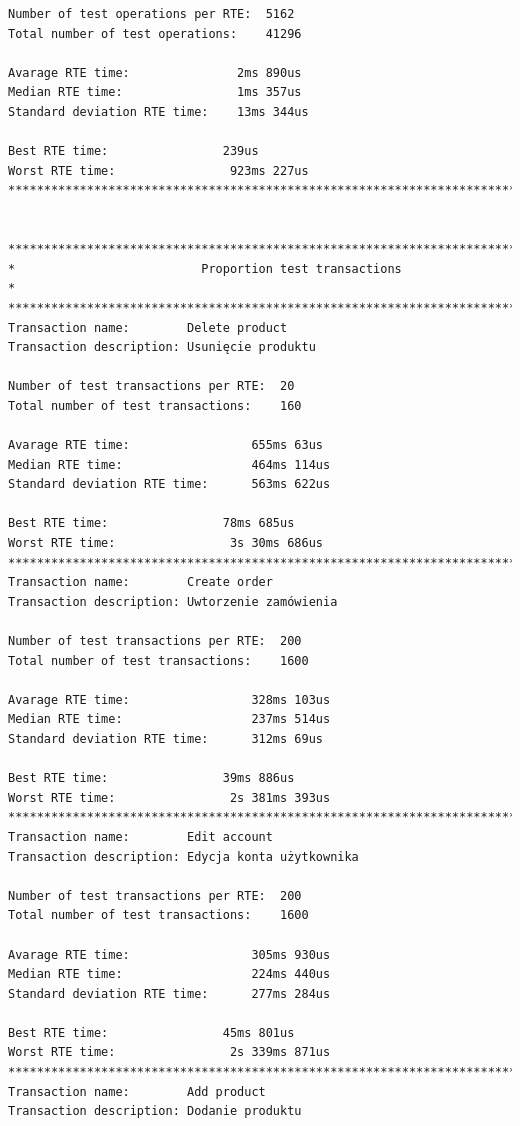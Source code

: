 \begin{Verbatim}
Number of test operations per RTE:  5162
Total number of test operations:    41296

Avarage RTE time:               2ms 890us
Median RTE time:                1ms 357us
Standard deviation RTE time:    13ms 344us

Best RTE time:                239us
Worst RTE time:                923ms 227us
*********************************************************************************


*********************************************************************************
*                          Proportion test transactions                         *
*********************************************************************************
Transaction name:        Delete product
Transaction description: Usunięcie produktu

Number of test transactions per RTE:  20
Total number of test transactions:    160

Avarage RTE time:                 655ms 63us
Median RTE time:                  464ms 114us
Standard deviation RTE time:      563ms 622us

Best RTE time:                78ms 685us
Worst RTE time:                3s 30ms 686us
*********************************************************************************
Transaction name:        Create order
Transaction description: Uwtorzenie zamówienia

Number of test transactions per RTE:  200
Total number of test transactions:    1600

Avarage RTE time:                 328ms 103us
Median RTE time:                  237ms 514us
Standard deviation RTE time:      312ms 69us

Best RTE time:                39ms 886us
Worst RTE time:                2s 381ms 393us
*********************************************************************************
Transaction name:        Edit account
Transaction description: Edycja konta użytkownika

Number of test transactions per RTE:  200
Total number of test transactions:    1600

Avarage RTE time:                 305ms 930us
Median RTE time:                  224ms 440us
Standard deviation RTE time:      277ms 284us

Best RTE time:                45ms 801us
Worst RTE time:                2s 339ms 871us
*********************************************************************************
Transaction name:        Add product
Transaction description: Dodanie produktu


\end{Verbatim}
